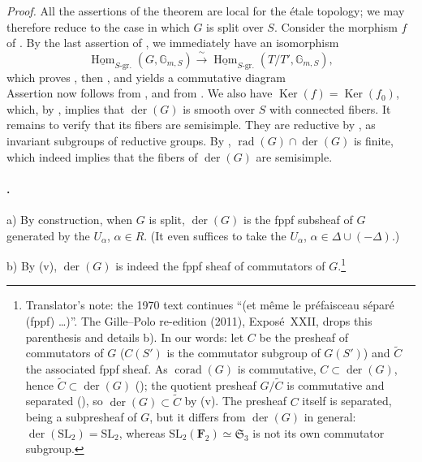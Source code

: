 \textit{Proof.}
All the assertions of the theorem are local for the étale
topology; we may therefore reduce to the case in which \(G\) is
split over \(S\). Consider the morphism \(f\) of . By the
last assertion of , we immediately have an isomorphism
\[
  \underline{\operatorname{Hom}}_{S\text{-gr.}}
    (G,\mathbb G_{m,S})
  \xrightarrow{\ \sim\ }
  \underline{\operatorname{Hom}}_{S\text{-gr.}}
    (T/T',\mathbb G_{m,S}),
\]
which proves \textup{}, then \textup{}, and yields a
commutative diagram
\[
  
\]
Assertion \textup{} now follows from , and
\textup{} from . We also have
\(\operatorname{Ker}(f)=\operatorname{Ker}(f_0)\), which, by
, implies that \(\operatorname{der}(G)\) is smooth over
\(S\) with connected fibers. It remains to verify that its fibers
are semisimple. They are reductive by , as invariant
subgroups of reductive groups. By \textup{},
\(\operatorname{rad}(G)\cap\operatorname{der}(G)\) is finite,
which indeed implies that the fibers of \(\operatorname{der}(G)\)
are semisimple.

\paragraph{.}
\textup{a)} By construction, when \(G\) is split,
\(\operatorname{der}(G)\) is the fppf subsheaf of \(G\) generated
by the \(U_\alpha\), \(\alpha\in R\). (It even suffices to take the
\(U_\alpha\), \(\alpha\in\Delta\cup(-\Delta)\).)

\textup{b)} By \textup{(v)}, \(\operatorname{der}(G)\) is indeed the fppf
sheaf of commutators of \(G\).\footnote{Translator's note: the 1970 text
continues ``(et même le préfaisceau séparé (fppf) \dots)''. The Gille--Polo
re-edition (2011), Exposé~XXII, drops this parenthesis and details b). In our
words: let \(C\) be the presheaf of commutators of \(G\) (\(C(S')\) is the
commutator subgroup of \(G(S')\)) and \(\widetilde C\) the associated fppf
sheaf. As \(\operatorname{corad}(G)\) is commutative,
\(C\subset\operatorname{der}(G)\), hence
\(\widetilde C\subset\operatorname{der}(G)\)
(); the quotient presheaf \(G/\widetilde C\) is commutative and
separated (), so \(\operatorname{der}(G)\subset\widetilde C\) by
\textup{(v)}. The presheaf \(C\) itself is separated, being a subpresheaf of
\(G\), but it differs from \(\operatorname{der}(G)\) in general:
\(\operatorname{der}(\mathrm{SL}_2)=\mathrm{SL}_2\), whereas
\(\mathrm{SL}_2(\mathbf F_2)\simeq\mathfrak S_3\) is not its own commutator
subgroup.}

